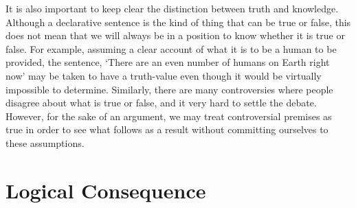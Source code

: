 
It is also important to keep clear the distinction between truth and knowledge.
Although a declarative sentence is the kind of thing that can be true or false, this does not mean that we will always be in a position to know whether it is true or false.
For example, assuming a clear account of what it is to be a human to be provided, the sentence, `There are an even number of humans on Earth right now' may be taken to have a truth-value even though it would be virtually impossible to determine.
Similarly, there are many controversies where people disagree about what is true or false, and it very hard to settle the debate.
However, for the sake of an argument, we may treat controversial premises as true in order to see what follows as a result without committing ourselves to these assumptions.






\section{Logical Consequence}
  \label{sec:LogicalConsequence}

